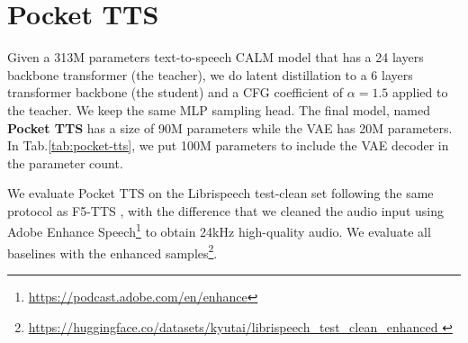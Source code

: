\begin{table}[h]
\caption{{Text-to-music results on the MusicCaps dataset.}}
\centering
{}
\label{tab:text_to_music}
\end{table}

\section{Pocket TTS}
\label{sec:pocket_tts}
Given a 313M parameters text-to-speech CALM model that has a 24 layers backbone transformer (the teacher), we do latent distillation to a 6 layers transformer backbone (the student) and a CFG coefficient of $\alpha=1.5$ applied to the teacher. We keep the same MLP sampling head. The final model, named \textbf{Pocket TTS} has a size of 90M parameters while the VAE has 20M parameters. In Tab.\ref{tab:pocket-tts}, we put 100M parameters to include the VAE decoder in the parameter count. 

We evaluate Pocket TTS on the Librispeech test-clean set following the same protocol as F5-TTS \citep{f5tts}, with the difference that we cleaned the audio input using Adobe Enhance Speech\footnote{\url{https://podcast.adobe.com/en/enhance}} to obtain 24kHz high-quality audio. We evaluate all baselines with the enhanced samples\footnote{\url{https://huggingface.co/datasets/kyutai/librispeech_test_clean_enhanced }}. 

